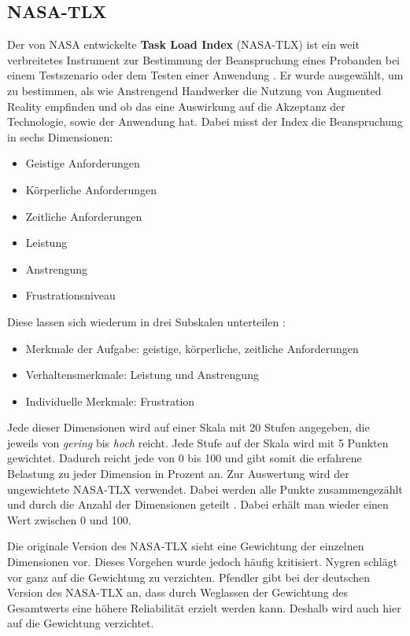 \subsection{NASA-TLX}

Der von NASA entwickelte \textbf{Task Load Index} (NASA-TLX) ist ein weit verbreitetes Instrument zur Bestimmung der Beanspruchung eines Probanden bei einem Testszenario oder dem Testen einer Anwendung \cite{giesa_bewertung_2003}. Er wurde ausgewählt, um zu bestimmen, als wie Anstrengend Handwerker die Nutzung von Augmented Reality empfinden und ob das eine Auswirkung auf die Akzeptanz der Technologie, sowie der Anwendung hat. Dabei misst der Index die Beanspruchung in sechs Dimensionen:

\begin{itemize}
	\item Geistige Anforderungen
	\item Körperliche Anforderungen
	\item Zeitliche Anforderungen
	\item Leistung
	\item Anstrengung
	\item Frustrationsniveau
\end{itemize}

Diese lassen sich wiederum in drei Subskalen unterteilen \cite{gros_bestimmung_2004}:

\begin{itemize}
	\item Merkmale der Aufgabe: geistige, körperliche, zeitliche Anforderungen
	\item Verhaltensmerkmale: Leistung und Anstrengung
	\item Individuelle Merkmale: Frustration
\end{itemize}

Jede dieser Dimensionen wird auf einer Skala mit 20 Stufen angegeben, die jeweils von \textit{gering} bis \textit{hoch} reicht. Jede Stufe auf der Skala wird mit 5 Punkten gewichtet. Dadurch reicht jede von 0 bis 100 und gibt somit die erfahrene Belastung zu jeder Dimension in Prozent an. Zur Auswertung wird der ungewichtete NASA-TLX verwendet. Dabei werden alle Punkte zusammengezählt und durch die Anzahl der Dimensionen geteilt \cite{hart_nasa_1986}. Dabei erhält man wieder einen Wert zwischen 0 und 100.

Die originale Version des NASA-TLX sieht eine Gewichtung der einzelnen Dimensionen vor. Dieses Vorgehen wurde jedoch häufig kritisiert. Nygren \cite{nygren_psychometric_1991} schlägt vor ganz auf die Gewichtung zu verzichten. Pfendler \cite{pfendler_vergleichende_1991} gibt bei der deutschen Version des NASA-TLX an, dass durch Weglassen der Gewichtung des Gesamtwerts eine höhere Reliabilität erzielt werden kann. Deshalb wird auch hier auf die Gewichtung verzichtet.

